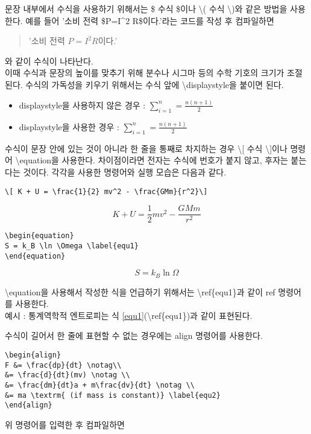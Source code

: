 문장 내부에서 수식을 사용하기 위해서는 \$ 수식 \$이나 \textbackslash( 수식 \textbackslash)와 같은 방법을 사용한다.
예를 들어 '소비 전력 \$P=I\^{}2 R\$이다.'라는 코드를 작성 후 컴파일하면
\begin{quote}
	'소비 전력 $P=I^2 R$이다.'
\end{quote}
\noindent 와 같이 수식이 나타난다. \\
이때 수식과 문장의 높이를 맞추기 위해 분수나 시그마 등의 수학 기호의 크기가 조절된다. 수식의 가독성을 키우기 위해서는 수식 앞에 \textbackslash displaystyle을 붙이면 된다.
\begin{itemize}
	\item displaystyle을 사용하지 않은 경우 : $\sum_{i=1}^{n} = \frac{n(n+1)}{2}$
	\item displaystyle을 사용한 경우 : \(\displaystyle \sum_{i=1}^{n} = \frac{n(n+1)}{2}\)
\end{itemize}

\vskip 2pc

\noindent 수식이 문장 안에 있는 것이 아니라 한 줄을 통째로 차지하는 경우 \textbackslash[ 수식 \textbackslash]이나 명령어 \textbackslash equation을 사용한다. 차이점이라면 전자는 수식에 번호가 붙지 않고, 후자는 붙는다는 것이다. 각각을 사용한 명령어와 실행 모습은 다음과 같다.

\begin{lstlisting}
\[ K + U = \frac{1}{2} mv^2 - \frac{GMm}{r^2}\]
\end{lstlisting}
\[ K + U = \frac{1}{2} mv^2 - \frac{GMm}{r^2}\]

\vskip 2pc

\noindent \begin{lstlisting}
\begin{equation}
S = k_B \ln \Omega \label{equ1}
\end{equation}
\end{lstlisting}
\begin{equation}
	S = k_B \ln \Omega \label{equ1}
\end{equation}

\noindent \textbackslash equation을 사용해서 작성한 식을 언급하기 위해서는 \textbackslash ref\{equ1\}과 같이 ref 명령어를 사용한다. \\
예시 : 통계역학적 엔트로피는 식 \ref{equ1}(\textbackslash ref\{equ1\})과 같이 표현된다.

\vskip 2pc

\noindent 수식이 길어서 한 줄에 표현할 수 없는 경우에는 align 명령어를 사용한다.
\begin{lstlisting}
\begin{align}
F &= \frac{dp}{dt} \notag\\
&= \frac{d}{dt}(mv) \notag \\
&= \frac{dm}{dt}a + m\frac{dv}{dt} \notag \\
&= ma \textrm{ (if mass is constant)} \label{equ2}
\end{align}
\end{lstlisting}
위 명령어를 입력한 후 컴파일하면

